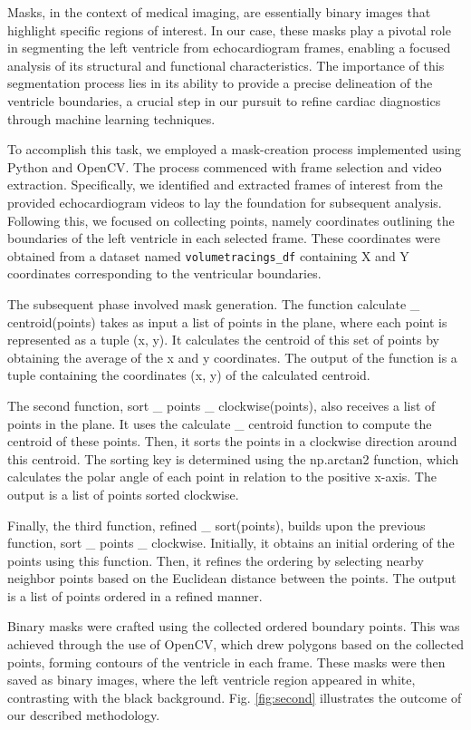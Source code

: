\documentclass[runningheads]{llncs}
\begin{document}
Masks, in the context of medical imaging, are essentially binary images that highlight specific regions of interest. In our case, these masks play a pivotal role in segmenting the left ventricle from echocardiogram frames, enabling a focused analysis of its structural and functional characteristics. The importance of this segmentation process lies in its ability to provide a precise delineation of the ventricle boundaries, a crucial step in our pursuit to refine cardiac diagnostics through machine learning techniques.
 
To accomplish this task, we employed a mask-creation process implemented using Python and OpenCV.
The process commenced with frame selection and video extraction. Specifically, we identified and extracted frames of interest from the provided echocardiogram videos to lay the foundation for subsequent analysis. Following this, we focused on collecting points, namely coordinates outlining the boundaries of the left ventricle in each selected frame. These coordinates were obtained from a dataset named \verb|volumetracings_df|  containing X and Y coordinates corresponding to the ventricular boundaries.

The subsequent phase involved mask generation.
The function calculate \_ centroid(points) takes as input a list of points in the plane, where each point is represented as a tuple (x, y). It calculates the centroid of this set of points by obtaining the average of the x and y coordinates. The output of the function is a tuple containing the coordinates (x, y) of the calculated centroid.

The second function, sort \_ points \_ clockwise(points), also receives a list of points in the plane. It uses the calculate \_ centroid function to compute the centroid of these points. Then, it sorts the points in a clockwise direction around this centroid. The sorting key is determined using the np.arctan2 function, which calculates the polar angle of each point in relation to the positive x-axis. The output is a list of points sorted clockwise.

Finally, the third function, refined \_ sort(points), builds upon the previous function, sort \_ points \_ clockwise. Initially, it obtains an initial ordering of the points using this function. Then, it refines the ordering by selecting nearby neighbor points based on the Euclidean distance between the points. The output is a list of points ordered in a refined manner.

Binary masks were crafted using the collected ordered boundary points. This was achieved through the use of OpenCV, which drew polygons based on the collected points, forming contours of the ventricle in each frame. These masks were then saved as binary images, where the left ventricle region appeared in white, contrasting with the black background. Fig. \ref{fig:second} illustrates the outcome of our described methodology.
\end{document}

